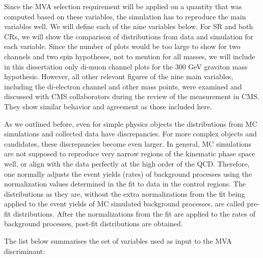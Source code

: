 Since the MVA selection requirement will be applied on a quantity that was computed based on these variables, the simulation has to reproduce the main variables well. We will define each of the nine variables below. For SR and both CRs, we will show the comparison of distributions from data and simulation for each variable. Since the number of plots would be too large to show for two channels and two spin hypotheses, not to mention for all masses, we will include in this dissertation only di-muon channel plots for the 300 GeV graviton mass hypothesis. However, all other relevant figures of the nine main variables, including the di-electron channel and other mass points, were examined and discussed with CMS collaborators during the review of the measurement in CMS. They show similar behavior and agreement as those included here.

As we outlined before, even for simple physics objects the distributions from MC simulations and collected data have discrepancies. For more complex objects and candidates, these discrepancies become even larger. In general, MC simulations are not supposed to reproduce very narrow regions of the kinematic phase space well, or align with the data perfectly at the high order of the QCD. Therefore, one normally adjusts the event yields (rates) of background processes using the normalization values determined in the fit to data in the control regions. The distributions as they are, without the extra normalizations from the fit being applied to the event yields of MC simulated background processes, are called pre-fit distributions. After the normalizations from the fit are applied to the rates of background processes, post-fit distributions are obtained. 

The list below summarises the set of variables used as input to the MVA discriminant:

